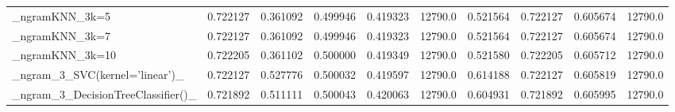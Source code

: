\begin{tabular}{lrrrrrrrrr}
\_ngramKNN\_3k=5                                     &  0.722127 &         0.361092 &      0.499946 &        0.419323 &        12790.0 &            0.521564 &         0.722127 &           0.605674 &           12790.0 \\
\_ngramKNN\_3k=7                                     &  0.722127 &         0.361092 &      0.499946 &        0.419323 &        12790.0 &            0.521564 &         0.722127 &           0.605674 &           12790.0 \\
\_ngramKNN\_3k=10                                    &  0.722205 &         0.361102 &      0.500000 &        0.419349 &        12790.0 &            0.521580 &         0.722205 &           0.605712 &           12790.0 \\
\_ngram\_3\_SVC(kernel='linear')\_                     &  0.722127 &         0.527776 &      0.500032 &        0.419597 &        12790.0 &            0.614188 &         0.722127 &           0.605819 &           12790.0 \\
\_ngram\_3\_DecisionTreeClassifier()\_                 &  0.721892 &         0.511111 &      0.500043 &        0.420063 &        12790.0 &            0.604931 &         0.721892 &           0.605995 &           12790.0 \\
\bottomrule
\end{tabular}
